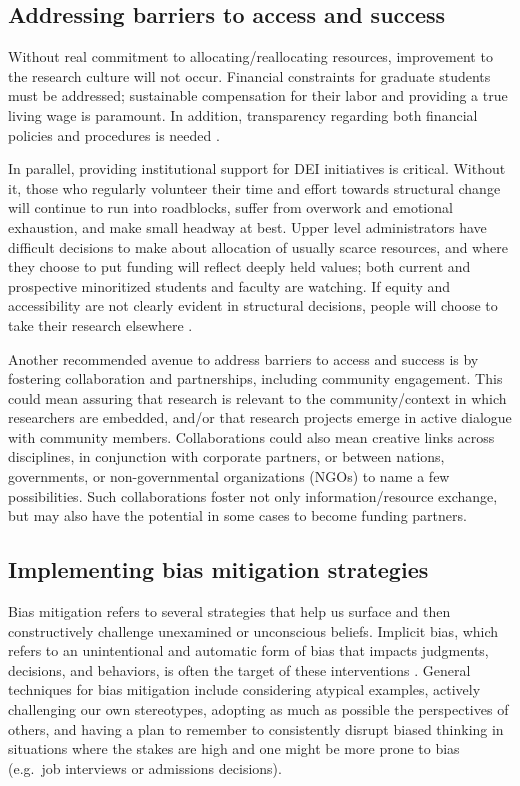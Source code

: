 \documentclass[
  11pt,
]{book}
\begin{document}
\subsection{Addressing barriers to access and success}\label{addressing-barriers-to-access-and-success}

Without real commitment to allocating/reallocating resources, improvement to the research culture will not occur. Financial constraints for graduate students must be addressed; sustainable compensation for their labor and providing a true living wage is paramount. In addition, transparency regarding both financial policies and procedures is needed \citep{noauthor_equitable_2023}.

In parallel, providing institutional support for DEI initiatives is critical. Without it, those who regularly volunteer their time and effort towards structural change will continue to run into roadblocks, suffer from overwork and emotional exhaustion, and make small headway at best. Upper level administrators have difficult decisions to make about allocation of usually scarce resources, and where they choose to put funding will reflect deeply held values; both current and prospective minoritized students and faculty are watching. If equity and accessibility are not clearly evident in structural decisions, people will choose to take their research elsewhere \citep{cirillo-mccarthy_developing_2022, perez-lopez_ten_2022}.

Another recommended avenue to address barriers to access and success is by fostering collaboration and partnerships, including community engagement. This could mean assuring that research is relevant to the community/context in which researchers are embedded, and/or that research projects emerge in active dialogue with community members. Collaborations could also mean creative links across disciplines, in conjunction with corporate partners, or between nations, governments, or non-governmental organizations (NGOs) to name a few possibilities. Such collaborations foster not only information/resource exchange, but may also have the potential in some cases to become funding partners.

\subsection{Implementing bias mitigation strategies}\label{implementing-bias-mitigation-strategies}

Bias mitigation refers to several strategies that help us surface and then constructively challenge unexamined or unconscious beliefs. Implicit bias, which refers to an unintentional and automatic form of bias that impacts judgments, decisions, and behaviors, is often the target of these interventions \citep{tung_making_2023}. General techniques for bias mitigation include considering atypical examples, actively challenging our own stereotypes, adopting as much as possible the perspectives of others, and having a plan to remember to consistently disrupt biased thinking in situations where the stakes are high and one might be more prone to bias (e.g.~job interviews or admissions decisions).
\end{document}
